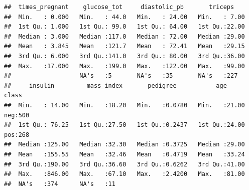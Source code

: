 \documentclass[
]{book}
\newenvironment{Shaded}{\begin{snugshade}}{\end{snugshade}}
\newcommand{\CommentTok}[1]{\textcolor[rgb]{0.56,0.35,0.01}{\textit{#1}}}
\newcommand{\DataTypeTok}[1]{\textcolor[rgb]{0.13,0.29,0.53}{#1}}
\newcommand{\DecValTok}[1]{\textcolor[rgb]{0.00,0.00,0.81}{#1}}
\newcommand{\KeywordTok}[1]{\textcolor[rgb]{0.13,0.29,0.53}{\textbf{#1}}}
\newcommand{\NormalTok}[1]{#1}
\newcommand{\OperatorTok}[1]{\textcolor[rgb]{0.81,0.36,0.00}{\textbf{#1}}}
\newcommand{\OtherTok}[1]{\textcolor[rgb]{0.56,0.35,0.01}{#1}}
\newcommand{\StringTok}[1]{\textcolor[rgb]{0.31,0.60,0.02}{#1}}
\theoremstyle{definition}
\theoremstyle{definition}
\theoremstyle{definition}
\theoremstyle{remark}
\begin{document}
\begin{Shaded}
\end{Shaded}

\begin{verbatim}
##  times_pregnant    glucose_tot     diastolic_pb       triceps     
##  Min.   : 0.000   Min.   : 44.0   Min.   : 24.00   Min.   : 7.00  
##  1st Qu.: 1.000   1st Qu.: 99.0   1st Qu.: 64.00   1st Qu.:22.00  
##  Median : 3.000   Median :117.0   Median : 72.00   Median :29.00  
##  Mean   : 3.845   Mean   :121.7   Mean   : 72.41   Mean   :29.15  
##  3rd Qu.: 6.000   3rd Qu.:141.0   3rd Qu.: 80.00   3rd Qu.:36.00  
##  Max.   :17.000   Max.   :199.0   Max.   :122.00   Max.   :99.00  
##                   NA's   :5       NA's   :35       NA's   :227    
##     insulin         mass_index       pedigree           age        class    
##  Min.   : 14.00   Min.   :18.20   Min.   :0.0780   Min.   :21.00   neg:500  
##  1st Qu.: 76.25   1st Qu.:27.50   1st Qu.:0.2437   1st Qu.:24.00   pos:268  
##  Median :125.00   Median :32.30   Median :0.3725   Median :29.00            
##  Mean   :155.55   Mean   :32.46   Mean   :0.4719   Mean   :33.24            
##  3rd Qu.:190.00   3rd Qu.:36.60   3rd Qu.:0.6262   3rd Qu.:41.00            
##  Max.   :846.00   Max.   :67.10   Max.   :2.4200   Max.   :81.00            
##  NA's   :374      NA's   :11
\end{verbatim}
\end{document}
